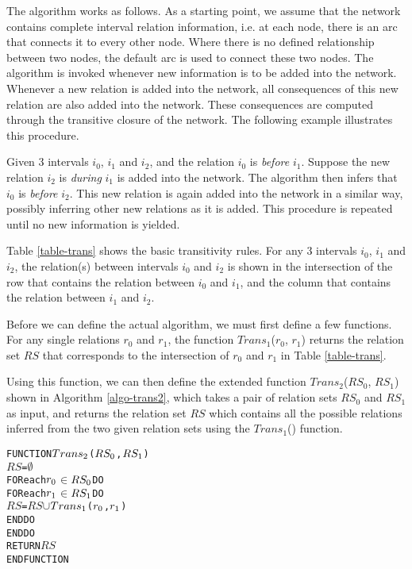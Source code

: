 \documentclass[11pt]{report}
\newenvironment{vverbatim}
{
  \begin{alltt}
}
{
    \vspace{-\baselineskip}
  \end{alltt}
}
\newlength{\valgorithmboxwidth}
\newenvironment{valgorithm}[3][tbhp]
{
  \setlength{\valgorithmboxwidth}{\linewidth-2em}

  \begin{valgorithmfloat}[#1]
    \caption{#2}
    \label{#3}
    \hspace{1em}
    \begin{lrbox}{\valgorithmbox}
      \begin{minipage}[l]{\valgorithmboxwidth}
        \small
        \begin{vverbatim}
}
{
        \end{vverbatim}
      \end{minipage}
    \end{lrbox}
    \framebox[\valgorithmboxwidth][l]{\usebox{\valgorithmbox}}
  \end{valgorithmfloat}
}
\begin{document}
          The algorithm works as follows. As a starting point, we assume that
          the network contains complete interval relation information, i.e. at
          each node, there is an arc that connects it to every other node.
          Where there is no defined relationship between two nodes, the default
          arc is used to connect these two nodes. The algorithm is invoked
          whenever new information is to be added into the network. Whenever a
          new relation is added into the network, all consequences of this new
          relation are also added into the network. These consequences are
          computed through the transitive closure of the network. The following
          example illustrates this procedure.

          Given 3 intervals $i_0$, $i_1$ and $i_2$, and the relation $i_0$ is
          {\em before} $i_1$. Suppose the new relation $i_2$ is {\em during}
          $i_1$ is added into the network. The algorithm then infers that
          $i_0$ is {\em before} $i_2$. This new relation is again added into
          the network in a similar way, possibly inferring other new relations
          as it is added. This procedure is repeated until no new information
          is yielded.

          Table \ref{table-trans} shows the basic transitivity rules. For any 3
          intervals $i_0$, $i_1$ and $i_2$, the relation(s) between intervals
          $i_0$ and $i_2$ is shown in the intersection of the row that contains
          the relation between $i_0$ and $i_1$, and the column that contains
          the relation between $i_1$ and $i_2$.

          Before we can define the actual algorithm, we must first define a few
          functions. For any single relations $r_0$ and $r_1$, the function
          $Trans_1$($r_0$, $r_1$) returns the relation set $RS$ that
          corresponds to the intersection of $r_0$ and $r_1$ in Table
          \ref{table-trans}.

          Using this function, we can then define the extended function
          $Trans_2$($RS_0$, $RS_1$) shown in Algorithm \ref{algo-trans2}, which
          takes a pair of relation sets $RS_0$ and $RS_1$ as input, and returns
          the relation set $RS$ which contains all the possible relations
          inferred from the two given relation sets using the $Trans_1$()
          function.

          \begin{valgorithm}[tbhp]{$Trans_{2}()$}{algo-trans2}
FUNCTION \(Trans\sb{2}\)(\(RS\sb{0}\), \(RS\sb{1}\))
  \(RS\) = \(\emptyset\)
  FOR each \(r\sb{0}\) \(\in\) \(RS\sb{0}\) DO
    FOR each \(r\sb{1}\) \(\in\) \(RS\sb{1}\) DO
      \(RS\) = \(RS\) \(\cup\) \(Trans\sb{1}\)(\(r\sb{0}\), \(r\sb{1}\))
    ENDDO
  ENDDO
  RETURN \(RS\)
ENDFUNCTION
          \end{valgorithm}
\end{document}
